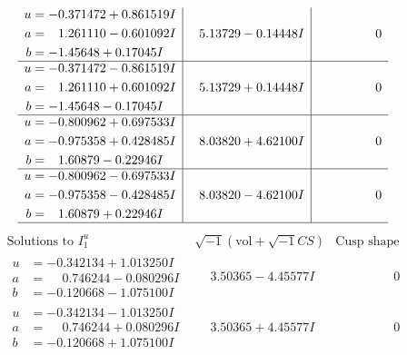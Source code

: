 \documentclass[1p]{elsarticle_modified}
\theoremstyle{definition}
\newcommand{\I}{\sqrt{-1}}
\begin{document}
$$\begin{array}{c|c|c}
\begin{aligned}
u &= -0.371472 + 0.861519 I \\
a &= \phantom{-}1.261110 - 0.601092 I \\
b &= -1.45648 + 0.17045 I\end{aligned}
 & \phantom{-}5.13729 - 0.14448 I & \phantom{-0.000000 } 0 \\ \hline\begin{aligned}
u &= -0.371472 - 0.861519 I \\
a &= \phantom{-}1.261110 + 0.601092 I \\
b &= -1.45648 - 0.17045 I\end{aligned}
 & \phantom{-}5.13729 + 0.14448 I & \phantom{-0.000000 } 0 \\ \hline\begin{aligned}
u &= -0.800962 + 0.697533 I \\
a &= -0.975358 + 0.428485 I \\
b &= \phantom{-}1.60879 - 0.22946 I\end{aligned}
 & \phantom{-}8.03820 + 4.62100 I & \phantom{-0.000000 } 0 \\ \hline\begin{aligned}
u &= -0.800962 - 0.697533 I \\
a &= -0.975358 - 0.428485 I \\
b &= \phantom{-}1.60879 + 0.22946 I\end{aligned}
 & \phantom{-}8.03820 - 4.62100 I & \phantom{-0.000000 } 0\\
 \hline 
 \end{array}$$\newpage$$\begin{array}{c|c|c}  
\text{Solutions to }I^u_{1}& \I (\text{vol} + \sqrt{-1}CS) & \text{Cusp shape}\\
 \hline 
\begin{aligned}
u &= -0.342134 + 1.013250 I \\
a &= \phantom{-}0.746244 - 0.080296 I \\
b &= -0.120668 - 1.075100 I\end{aligned}
 & \phantom{-}3.50365 - 4.45577 I & \phantom{-0.000000 } 0 \\ \hline\begin{aligned}
u &= -0.342134 - 1.013250 I \\
a &= \phantom{-}0.746244 + 0.080296 I \\
b &= -0.120668 + 1.075100 I\end{aligned}
 & \phantom{-}3.50365 + 4.45577 I & \phantom{-0.000000 } 0 \\ \hline\begin{aligned}

\end{aligned}
\end{array}$$
\end{document}
